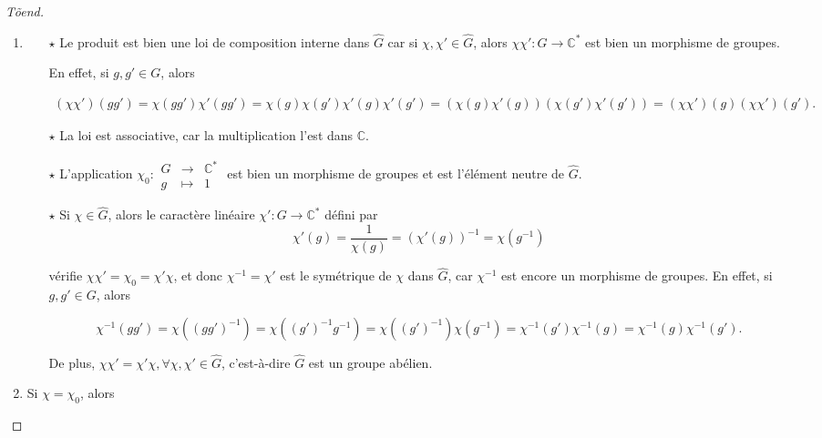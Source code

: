 \documentclass[french]{book}
\theoremstyle{definition}
\theoremstyle{remark}
\begin{document}
  \begin{proof}[T\~{o}end]

    \

  \begin{enumerate}
    \item \begin{itemize}
      \item[$\star$] Le produit est bien une loi de composition interne dans \(\hat{G}\) car si \(\chi, \chi' \in \hat{G}\), alors \(\chi \chi' : G \longrightarrow \mathbb{C} ^{*}\) est bien un morphisme de groupes.

      En effet, si \(g, g' \in G\), alors

      \begin{gather*}
        (\chi \chi')(gg') = \chi(gg') \chi'(gg') = \chi(g)\chi(g') \chi'(g)\chi'(g') = (\chi(g) \chi'(g))(\chi(g')\chi'(g')) = (\chi\chi')(g)(\chi\chi')(g').
      \end{gather*}

      \item[$\star$] La loi est associative, car la multiplication l'est dans \(\mathbb{C}\).
      \item[$\star$] L'application \(\chi _{0} : \begin{matrix}
      G & \longrightarrow & \mathbb{C} ^{*} \\
      g & \longmapsto & 1
      \end{matrix}\) est bien un morphisme de groupes et est l'élément neutre de \(\hat{G}\).

      \item[$\star$] Si \(\chi \in \hat{G}\), alors le caractère linéaire \(\chi' : G \longrightarrow \mathbb{C} ^{*}\) défini par \[\chi'(g) = \frac{1}{\chi(g)} = (\chi'(g)) ^{-1} = \chi(g ^{-1})\]

      vérifie \(\chi \chi' = \chi _{0} = \chi'\chi\), et donc \(\chi ^{-1} = \chi'\) est le symétrique de \(\chi\) dans \(\hat{G} \), car \(\chi ^{-1}\) est encore un morphisme de groupes. En effet, si \(g, g' \in G\), alors

      \[\chi ^{-1}(gg') = \chi((gg') ^{-1}) = \chi ((g')^{-1} g ^{-1}) = \chi((g')^{-1}) \chi(g ^{-1}) = \chi ^{-1}(g') \chi ^{-1}(g) = \chi ^{-1}(g) \chi ^{-1}(g').\]

      De plus, \(\chi \chi' = \chi' \chi, \forall \chi, \chi' \in \hat{G}\), c'est-à-dire \(\hat{G}\) est un groupe abélien.
    \end{itemize}

    \item Si \(\chi = \chi_0\), alors


\end{enumerate}
\end{proof}
\end{document}
